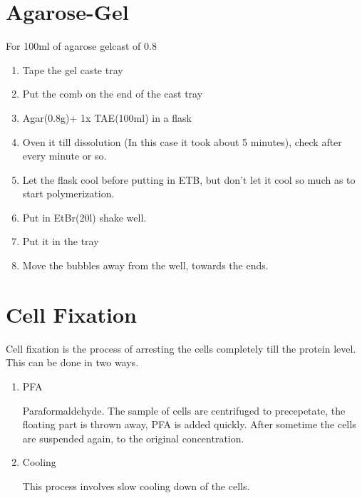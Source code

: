 \documentclass[11pt,twoside,a4paper]{article}
\begin{document}
\section{Agarose-Gel}
For 100ml of agarose gelcast of 0.8%
\begin{enumerate}
	\item Tape the gel caste tray
	\item Put the comb on the end of the cast tray
	\item Agar(0.8g)+ 1x TAE(100ml) in a flask
	\item Oven it till dissolution (In this case it took about 5 minutes), check after every minute or so.
	\item Let the flask cool before putting in ETB, but don't let it cool so much as to start polymerization.
	\item Put in EtBr(20\textmu{}l) shake well.
	\item Put it in the tray
	\item Move the bubbles away from the well, towards the ends.
\end{enumerate}

\section{Cell Fixation}
Cell fixation is the process of arresting the cells completely till the protein level. This can be done in two ways.
\begin{enumerate}
	\item PFA

		Paraformaldehyde. The sample of cells are centrifuged to precepetate, the floating part is thrown away, PFA is added quickly. After sometime the cells are suspended again, to the original concentration.
	\item Cooling

		This process involves slow cooling down of the cells.
\end{enumerate}
\end{document}
